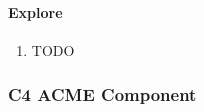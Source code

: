 \documentclass[letterpaper,10pt,english]{sphinxmanual}
\begin{document}
\paragraph{Explore}
\label{\detokenize{C4/c4acme:id3}}\begin{enumerate}
%
\item {} 
TODO

\end{enumerate}


\subsubsection{C4 ACME Component}
\label{\detokenize{C4/c4acme:c4-acme-component}}
\begin{figure}[htbp]
\centering
\capstart
\caption{}\label{\detokenize{C4/c4acme:id9}}\end{figure}

\begin{figure}[htbp]
\centering
\capstart

\caption{}\label{\detokenize{C4/c4acme:id10}}\end{figure}
\end{document}

